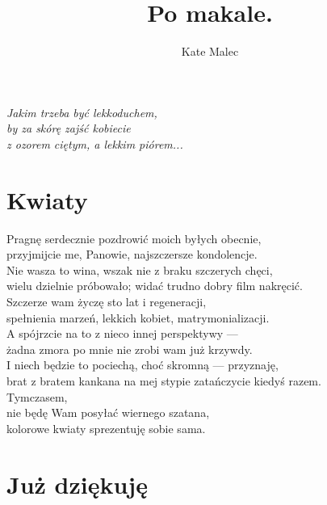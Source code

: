 \documentclass[12pt, a4paper]{memoir}
\title{Po makale.}
\author{Kate Malec}
\date{\the\year}
\begin{document}
\maketitle
\thispagestyle{empty}
\newpage

\thispagestyle{empty}
\vspace*{\fill}
\begin{flushright}
    \itshape
    Jakim trzeba być lekkoduchem,\\
    by za skórę zajść kobiecie\\
    z ozorem ciętym, a lekkim piórem...
\end{flushright}

\newpage
\tableofcontents*
\newpage

\section{Kwiaty}

\begin{flushleft}
Pragnę serdecznie pozdrowić moich byłych obecnie,\\
przyjmijcie me, Panowie, najszczersze kondolencje.\\[\baselineskip]

Nie wasza to wina, wszak nie z braku szczerych chęci,\\
wielu dzielnie próbowało; widać trudno dobry film nakręcić.\\[\baselineskip]

Szczerze wam życzę sto lat i regeneracji,\\
spełnienia marzeń, lekkich kobiet, matrymonializacji.\\[\baselineskip]

A spójrzcie na to z nieco innej perspektywy —\\
żadna zmora po mnie nie zrobi wam już krzywdy.\\[\baselineskip]

I niech będzie to pociechą, choć skromną — przyznaję,\\
brat z bratem kankana na mej stypie zatańczycie kiedyś razem.\\[\baselineskip]

Tymczasem,\\
nie będę Wam posyłać wiernego szatana,\\
kolorowe kwiaty sprezentuję sobie sama.
\end{flushleft}

\newpage
\section{Już dziękuję}
\end{document}
